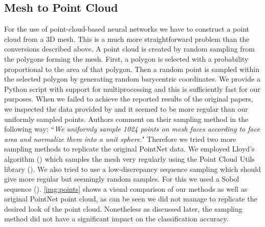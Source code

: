 \subsection{Mesh to Point Cloud}
\label{subsec:pointcloud}
For the use of point-cloud-based neural networks we have to construct a point cloud from a 3D mesh. This is a much more straightforward problem than the conversions described above. A point cloud is created by random sampling from the polygons forming the mesh. First, a polygon is selected with a probability proportional to the area of that polygon. Then a random point is sampled within the selected polygon by generating random barycentric coordinates. We provide a Python script with support for multiprocessing and this is sufficiently fast for our purposes. When we failed to achieve the reported results of the original papers, we inspected the data provided by \cite{qi_pointnet_2016} and it seemed to be more regular than our uniformly sampled points. Authors comment on their sampling method in the following way: ``\textit{We uniformly sample 1024 points on mesh faces according
to face area and normalize them into a unit sphere}." Therefore we tried two more sampling methods to replicate the original PointNet data. We employed Lloyd's algorithm (\cite{lloyd_least_1982}) which samples the mesh very regularly using the Point Cloud Utils library (\cite{williams_point_2019}). We also tried to use a low-discrepancy sequence sampling which should give more regular but seemingly random samples. For this we used a Sobol sequence (\cite{sobol_distribution_1967}). \autoref{img:points} shows a visual comparison of our methods as well as original PointNet point cloud, as can be seen we did not manage to replicate the desired look of the point cloud. Nonetheless as discussed later, the sampling method did not have a significant impact on the classification accuracy.

